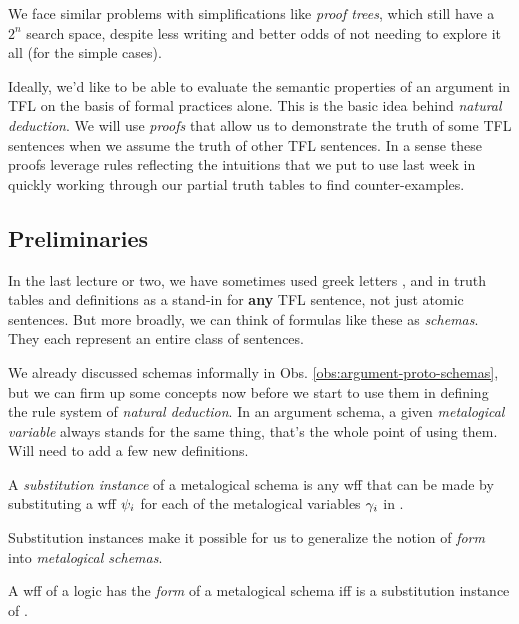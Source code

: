 We face similar problems with simplifications like \emph{proof trees}, which
still have a $2^n$ search space, despite less writing and better odds of not
needing to explore it all (for the simple cases).

Ideally, we'd like to be able to evaluate the semantic properties of an argument
in TFL on the basis of formal practices alone. This is the basic idea behind
\emph{natural deduction}. We will use \emph{proofs} that allow us to demonstrate
the truth of some TFL sentences when we assume the truth of other TFL sentences.
In a sense these proofs leverage rules reflecting the intuitions that we put to
use last week in quickly working through our partial truth tables to find
counter-examples.

\subsection{Preliminaries}

In the last lecture or two, we have sometimes used greek letters \ephi, \spsi
and \schi in truth tables and definitions as a stand-in for \textbf{any} TFL
sentence, not just atomic sentences. But more broadly, we can think of formulas
like these as \emph{schemas}. They each represent an entire class of sentences.

We already discussed schemas informally in Obs.
\ref{obs:argument-proto-schemas}, but we can firm up some concepts now before we
start to use them in defining the rule system of \emph{natural deduction}. In
an argument schema, a given \emph{metalogical variable} always stands for the
same thing, that's the whole point of using them. Will need to add a few new
definitions.

\begin{definition}
  A \emph{substitution instance} of a metalogical schema \schi is any wff \sphi
  that can be made by substituting a wff $\psi_i$ for each of the metalogical
  variables $\gamma_i$ in \echi.
\end{definition}

Substitution instances make it possible for us to generalize the notion of
\emph{form} into \emph{metalogical schemas}.

\begin{definition}
  A wff \sphi of a logic has the \emph{form} of a metalogical schema \schi iff
  \sphi is a substitution instance of \echi. 
\end{definition}

